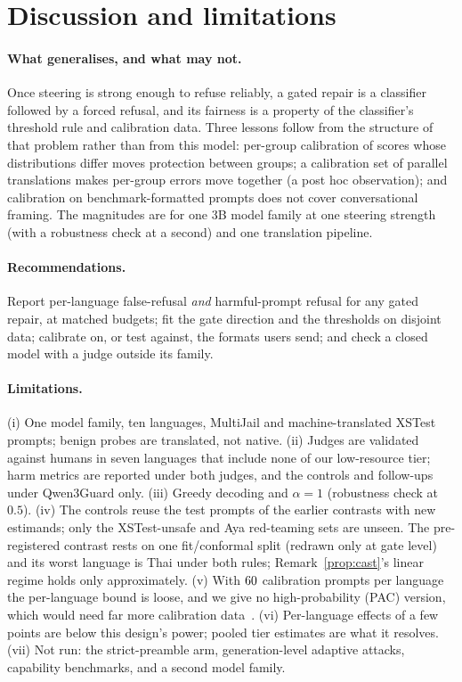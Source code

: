 \documentclass{article}
\begin{document}
\section{Discussion and limitations}
\label{sec:limitations}
\paragraph{What generalises, and what may not.} Once steering is strong enough to refuse reliably, a gated repair is a classifier followed by a forced refusal, and its fairness is a property of the classifier's threshold rule and calibration data. Three lessons follow from the structure of that problem rather than from this model: per-group calibration of scores whose distributions differ moves protection between groups; a calibration set of parallel translations makes per-group errors move together (a post hoc observation); and calibration on benchmark-formatted prompts does not cover conversational framing. The magnitudes are for one 3B model family at one steering strength (with a robustness check at a second) and one translation pipeline.
\paragraph{Recommendations.} Report per-language false-refusal \emph{and} harmful-prompt refusal for any gated repair, at matched budgets; fit the gate direction and the thresholds on disjoint data; calibrate on, or test against, the formats users send; and check a closed model with a judge outside its family.
\paragraph{Limitations.} (i) One model family, ten languages, MultiJail and machine-translated XSTest prompts; benign probes are translated, not native. (ii) Judges are validated against humans in seven languages that include none of our low-resource tier; harm metrics are reported under both judges, and the controls and follow-ups under Qwen3Guard only. (iii) Greedy decoding and $\alpha{=}1$ (robustness check at $0.5$). (iv) The controls reuse the test prompts of the earlier contrasts with new estimands; only the XSTest-unsafe and Aya red-teaming sets are unseen. The pre-registered contrast rests on one fit/conformal split (redrawn only at gate level) and its worst language is Thai under both rules; Remark~\ref{prop:cast}'s linear regime holds only approximately. (v) With $60$ calibration prompts per language the per-language bound is loose, and we give no high-probability (PAC) version, which would need far more calibration data~\citep{angelopoulos2021ltt}. (vi) Per-language effects of a few points are below this design's power; pooled tier estimates are what it resolves. (vii) Not run: the strict-preamble arm, generation-level adaptive attacks, capability benchmarks, and a second model family.
\end{document}
